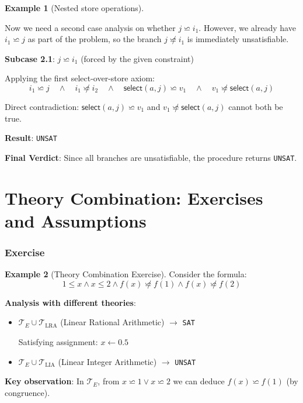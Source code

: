 \documentclass[11pt,a4paper]{article}
\theoremstyle{definition}
\newtheorem{example}{Example}[section]
\theoremstyle{plain}
\theoremstyle{remark}
\begin{document}
\begin{example}[Nested store operations]
\begin{tcolorbox}[colback=red!5!white,colframe=red!75!black,title=\textbf{Example 4: UNSAT with Nested Stores},breakable]
Now we need a second case analysis on whether $j \backsimeq i_1$. However, we already have $i_1 \backsimeq j$ as part of the problem, so the branch $j \not\backsimeq i_1$ is immediately unsatisfiable.

\textbf{Subcase 2.1}: $j \backsimeq i_1$ (forced by the given constraint)

Applying the first select-over-store axiom:
\[
i_1 \backsimeq j \quad \wedge \quad i_1 \not\backsimeq i_2 \quad \wedge \quad \textsf{select}(a, j) \backsimeq v_1 \quad \wedge \quad v_1 \not\backsimeq \textsf{select}(a, j)
\]

Direct contradiction: $\textsf{select}(a, j) \backsimeq v_1$ and $v_1 \not\backsimeq \textsf{select}(a, j)$ cannot both be true.

\textbf{Result}: \texttt{UNSAT}

\vspace{0.5em}

\textbf{Final Verdict}: Since all branches are unsatisfiable, the procedure returns \texttt{UNSAT}.
\end{tcolorbox}
\end{example} 



\newpage 

\part{Theory Combination: Exercises and Assumptions}

\section{Exercise}

\begin{example}[Theory Combination Exercise]
Consider the formula:
\[
1 \leq x \wedge x \leq 2 \wedge f(x) \not\backsimeq f(1) \wedge f(x) \not\backsimeq f(2)
\]

\textbf{Analysis with different theories}:

\begin{itemize}
    \item $\mathcal{T}_E \cup \mathcal{T}_{\text{LRA}}$ (Linear Rational Arithmetic) $\longrightarrow$ \texttt{SAT}

    Satisfying assignment: $x \leftarrow 0.5$

    \item $\mathcal{T}_E \cup \mathcal{T}_{\text{LIA}}$ (Linear Integer Arithmetic) $\longrightarrow$ \texttt{UNSAT}
\end{itemize}

\textbf{Key observation}: In $\mathcal{T}_E$, from $x \backsimeq 1 \vee x \backsimeq 2$ we can deduce $f(x) \backsimeq f(1)$ (by congruence).
\end{example}
\end{document}
